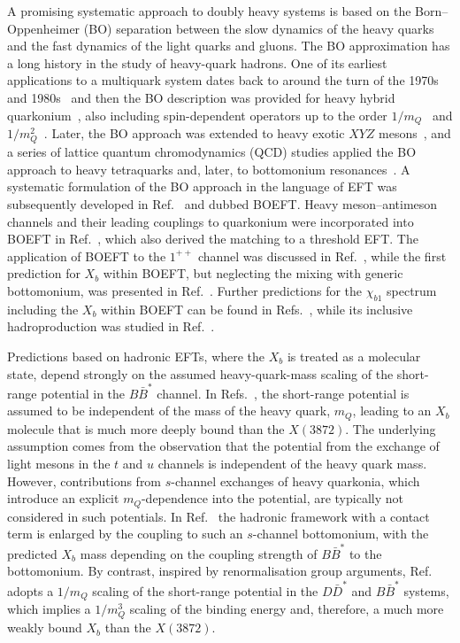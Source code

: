 \documentclass[aps,prd,showpacs,amsmath,twocolumn,superscriptaddress,floatfix,nofootinbib,notitlepage]{revtex4-2}
\newcommand{\X}{X(3872)}
\newcommand{\Xb}{X_b}
\begin{document}
A promising systematic approach to doubly heavy systems is based on the Born--Oppenheimer (BO) separation \cite{Born:1927} between the slow dynamics of the heavy quarks and the fast dynamics of the light quarks and gluons. The BO approximation has a long history in the study of heavy-quark hadrons. One of its earliest applications to a multiquark system dates back to around the turn of the 1970s and 1980s~\cite{Chao:1979tg} and then the BO description was provided for heavy hybrid quarkonium~\cite{Griffiths:1983ah,Juge:1997nc,Juge:1997nd,Juge:1999ie,Guo:2008yz}, also including spin-dependent operators up to the order $1/m_Q$~\cite{Soto:2017one} and $1/m^2_Q$~\cite{Brambilla:2018pyn,Brambilla:2019jfi}. Later, the BO approach was extended to heavy exotic $XYZ$ mesons~\cite{Braaten:2014qka}, and a series of lattice quantum chromodynamics (QCD) studies applied the BO approach to heavy tetraquarks and, later, to bottomonium resonances~\cite{Bicudo:2015vta,Bicudo:2015kna,Bicudo:2016ooe,Bicudo:2017szl,Bicudo:2019ymo,Bicudo:2020qhp,Bicudo:2022ihz}. A systematic formulation of the BO approach in the language of EFT was subsequently developed in Ref.~\cite{Brambilla:2017uyf} and dubbed BOEFT.
Heavy meson--antimeson channels and their leading couplings to
quarkonium were incorporated into BOEFT in
Ref.~\cite{TarrusCastella:2022rxb}, which also derived the
matching to a threshold EFT.
The application of BOEFT to the $1^{++}$ channel was discussed in Ref.~\cite{Berwein:2024ztx}, while the first prediction for $\Xb$ within BOEFT, but neglecting the mixing with generic bottomonium, was presented in Ref.~\cite{Braaten:2024tbm}. Further predictions for the $\chi_{b1}$ spectrum including the $\Xb$ within BOEFT can be found in 
Refs.~\cite{Brambilla:2024imu,Alasiri:2026vfz,Brambilla:2026zfw,Brambilla:2026jqz}, while its inclusive hadroproduction was studied in Ref.~\cite{Brambilla:2026ujo}. 

Predictions based on hadronic EFTs, where the $\Xb$ is treated as a molecular state, depend strongly on the assumed heavy-quark-mass scaling of the short-range potential in the $B\bar{B}^*$ channel. In Refs.~\cite{Tornqvist:1993ng,Nieves:2011zz,Guo:2013sya,Karliner:2013dqa,Ozpineci:2013zas,Karliner:2015ina,Yamaguchi:2019vea}, the short-range potential is assumed to be independent of the mass of the heavy quark, $m_Q$, leading to an $\Xb$ molecule that is much more deeply bound than the $\X$. The
underlying assumption comes from
the observation that the potential from the exchange of light mesons in the $t$ and $u$ channels is independent of the heavy quark mass. However, contributions from $s$-channel exchanges of heavy quarkonia, which introduce an explicit $m_Q$-dependence into the potential, are typically not considered in such potentials. 
In Ref.~\cite{Cincioglu:2016fkm} the hadronic framework with a contact term is enlarged by the coupling to such an $s$-channel bottomonium, with the predicted $\Xb$ mass depending on the coupling strength of $B\bar{B}^*$ to the bottomonium.
By contrast, 
inspired by renormalisation group arguments,
Ref.~\cite{AlFiky:2005jd} adopts a $1/m_Q$ scaling of the short-range potential in the $D\bar{D}^*$ and $B\bar{B}^*$ systems, which implies a $1/m_Q^3$ scaling of the binding energy and, therefore, a much more weakly bound $\Xb$ than the $ \X$. 
\end{document}
